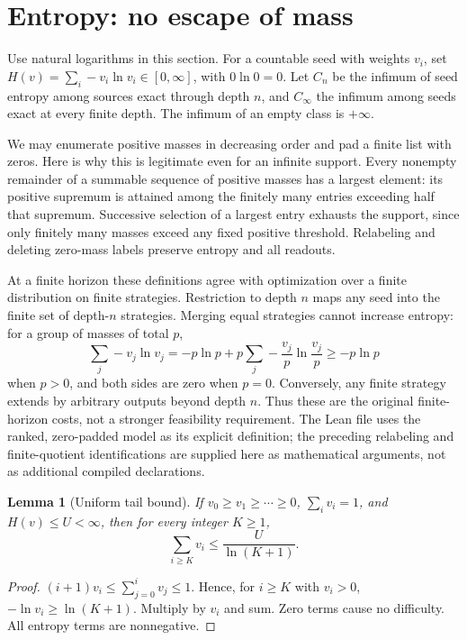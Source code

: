 \documentclass[11pt]{article}
\newtheorem{lemma}[theorem]{Lemma}
\begin{document}
\section{Entropy: no escape of mass}\label{sec:entropy}
Use natural logarithms in this section. For a countable seed with weights
$v_i$, set $H(v)=\sum_i-v_i\ln v_i\in[0,\infty]$, with $0\ln0=0$.
Let $C_n$ be the infimum of seed entropy among sources exact through depth
$n$, and $C_\infty$ the infimum among seeds exact at every finite depth.
The infimum of an empty class is $+\infty$.

We may enumerate positive masses in decreasing order and pad a finite
list with zeros. Here is why this is legitimate even for an infinite
support. Every nonempty remainder of a summable sequence of positive
masses has a largest element: its positive supremum is attained among
the finitely many entries exceeding half that supremum. Successive
selection of a largest entry exhausts the support, since only finitely
many masses exceed any fixed positive threshold. Relabeling and deleting
zero-mass labels preserve entropy and all readouts.

At a finite horizon these definitions agree with optimization over a
finite distribution on finite strategies. Restriction to depth $n$ maps
any seed into the finite set of depth-$n$ strategies. Merging equal
strategies cannot increase entropy: for a group of masses of total $p$,
\[
 \sum_j-v_j\ln v_j=-p\ln p+
       p\sum_j-\frac{v_j}{p}\ln\frac{v_j}{p}\ge -p\ln p
\]
when $p>0$, and both sides are zero when $p=0$. Conversely, any finite
strategy extends by arbitrary outputs beyond depth $n$. Thus these are
the original finite-horizon costs, not a stronger feasibility requirement.
The Lean file uses the ranked, zero-padded model as its explicit definition;
the preceding relabeling and finite-quotient identifications are supplied
here as mathematical arguments, not as additional compiled declarations.

\begin{lemma}[Uniform tail bound]\label{lem:tail}
If $v_0\ge v_1\ge\cdots\ge0$, $\sum_iv_i=1$, and $H(v)\le U<\infty$,
then for every integer $K\ge1$,
\[
 \sum_{i\ge K}v_i\le\frac{U}{\ln(K+1)}.
\]
\end{lemma}
\begin{proof}
$(i+1)v_i\le\sum_{j=0}^iv_j\le1$. Hence, for $i\ge K$ with $v_i>0$,
$-\ln v_i\ge\ln(K+1)$. Multiply by $v_i$ and sum. Zero terms cause
no difficulty. All entropy terms are nonnegative.
\end{proof}
\end{document}
